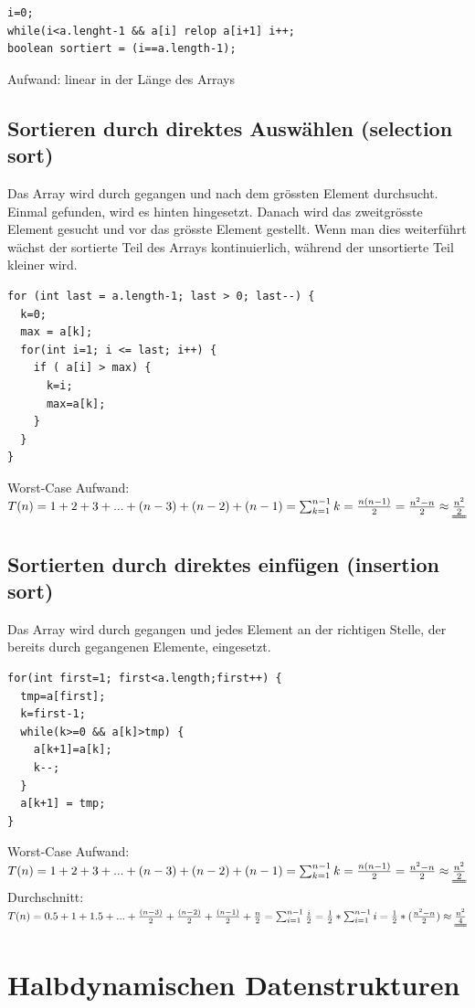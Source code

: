 \documentclass[a4paper,10pt]{article}
\begin{document}
\begin{lstlisting}
i=0;
while(i<a.lenght-1 && a[i] relop a[i+1] i++;
boolean sortiert = (i==a.length-1);
\end{lstlisting}
Aufwand: linear in der L\"ange des Arrays \\

\subsection{Sortieren durch direktes Ausw\"ahlen (selection sort)}
Das Array wird durch gegangen und nach dem gr\"ossten Element durchsucht. Einmal gefunden, wird es hinten hingesetzt. Danach wird das zweitgr\"osste Element gesucht und vor das gr\"osste Element gestellt. Wenn man dies weiterf\"uhrt w\"achst der sortierte Teil des Arrays kontinuierlich, w\"ahrend der unsortierte Teil kleiner wird.
\begin{lstlisting}
for (int last = a.length-1; last > 0; last--) {
  k=0;
  max = a[k];
  for(int i=1; i <= last; i++) {
    if ( a[i] > max) {
      k=i;
      max=a[k];
    }
  }
}	
\end{lstlisting}
Worst-Case Aufwand: $T(n)=1+2+3+...+(n-3)+(n-2)+(n-1)=\sum^{n-1}_{k=1} k=\frac{n(n-1)}{2}=\frac{n^2-n}{2}\approx\uuline{\frac{n^2}{2}}$

\subsection{Sortierten durch direktes einf\"ugen (insertion sort)}
Das Array wird durch gegangen und jedes Element an der richtigen Stelle, der bereits durch gegangenen Elemente, eingesetzt.
\begin{lstlisting}
for(int first=1; first<a.length;first++) {
  tmp=a[first];
  k=first-1;
  while(k>=0 && a[k]>tmp) {
    a[k+1]=a[k];
    k--;
  }
  a[k+1] = tmp;
}
\end{lstlisting}
Worst-Case Aufwand: $T(n)=1+2+3+...+(n-3)+(n-2)+(n-1)=\sum^{n-1}_{k=1} k=\frac{n(n-1)}{2}=\frac{n^2-n}{2}\approx\uuline{\frac{n^2}{2}}$
Durchschnitt: $T(n)=0.5 + 1 + 1.5 + ... + \frac{(n-3)}{2} + \frac{(n-2)}{2} + \frac{(n-1)}{2}  + \frac{n}{2}=\sum^{n-1}_{i=1} \frac{i}{2}=\frac{1}{2}*\sum^{n-1}_{i=1} i = \frac{1}{2}*(\frac{n^2-n}{2})\approx\uuline{\frac{n^2}{4}}$

\section{Halbdynamischen Datenstrukturen}
\end{document}
